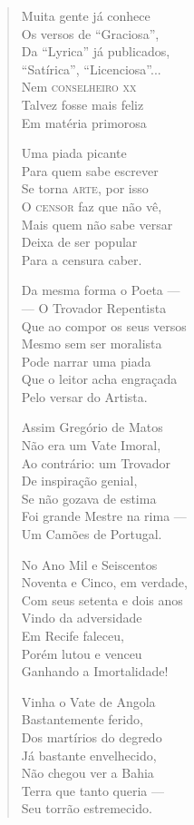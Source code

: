 \begin{verse}
Muita gente já conhece \\
Os versos de ``Graciosa'', \\
Da ``Lyrica'' já publicados, \\
``Satírica'', ``Licenciosa''... \\
Nem \textsc{conselheiro xx} \\
Talvez fosse mais feliz \\
Em matéria primorosa 
\pagebreak

Uma piada picante \\
Para quem sabe escrever \\
Se torna \textsc{arte}, por isso \\
O \textsc{censor} faz que não vê, \\
Mais quem não sabe versar \\
Deixa de ser popular \\
Para a censura caber. 

Da mesma forma o Poeta ---\\
--- O Trovador Repentista \\
Que ao compor os seus versos \\
Mesmo sem ser moralista \\
Pode narrar uma piada \\
Que o leitor acha engraçada \\
Pelo versar do Artista. 

Assim Gregório de Matos \\
Não era um Vate Imoral, \\
Ao contrário: um Trovador \\
De inspiração genial, \\
Se não gozava de estima \\
Foi grande Mestre na rima ---\\
Um Camões de Portugal. 

No Ano Mil e Seiscentos \\
Noventa e Cinco, em verdade, \\
Com seus setenta e dois anos \\
Vindo da adversidade \\
Em Recife faleceu, \\
Porém lutou e venceu \\
Ganhando a Imortalidade! 
\pagebreak

Vinha o Vate de Angola \\
Bastantemente ferido, \\
Dos martírios do degredo \\
Já bastante envelhecido, \\
Não chegou ver a Bahia \\
Terra que tanto queria ---\\
Seu torrão estremecido. 


\end{verse}
